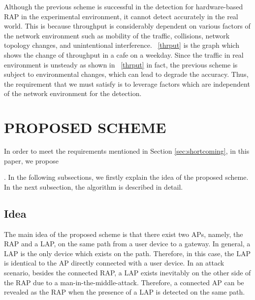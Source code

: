 \documentclass[conference]{IEEEtran}
\begin{document}
Although the previous scheme is successful in the detection for hardware-based RAP in the experimental environment, it cannot detect accurately in the real world.
This is because throughput is considerably dependent on various factors of the network environment such as mobility of the traffic, collisions, network topology changes, and unintentional interference.
\figurename~\ref{thrput} is the graph which shows the change of throughput in a cafe on a weekday.
Since the traffic in real environment is unsteady as shown in \figurename~\ref{thrput} in fact, the previous scheme is subject to environmental changes, which can lead to degrade the accuracy.
Thus, the requirement that we must satisfy is to leverage factors which are independent of the network environment for the detection.

\section{PROPOSED SCHEME}\label{sec:4}
In order to meet the requirements mentioned in Section \ref{sec:shortcoming}, in this paper, we propose \title{}.
In the following subsections, we firstly explain the idea of the proposed scheme.
In the next subsection, the algorithm is described in detail.

\subsection{Idea}
The main idea of the proposed scheme is that there exist two APs, namely, the RAP and a LAP, on the same path from a user device to a gateway.
In general, a LAP is the only device which exists on the path.
Therefore, in this case, the LAP is identical to the AP directly connected with a user device.
In an attack scenario, besides the connected RAP, a LAP exists inevitably on the other side of the RAP due to a man-in-the-middle-attack.
Therefore, a connected AP can be revealed as the RAP when the presence of a LAP is detected on the same path.
\end{document}
